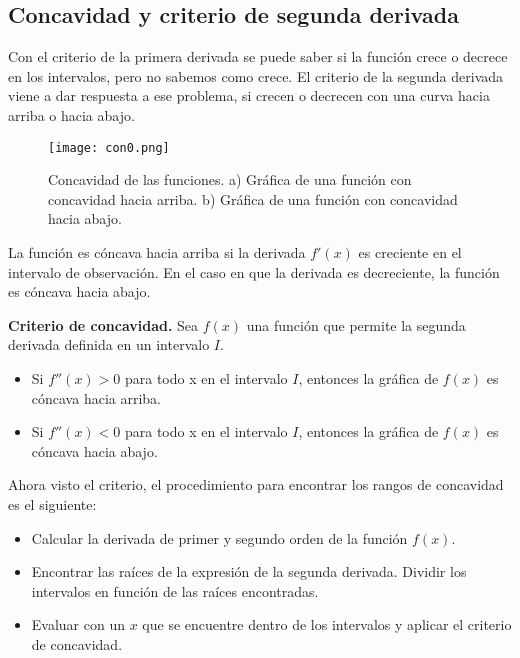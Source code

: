 \subsection{Concavidad y criterio de segunda derivada}

Con el criterio de la primera derivada se puede saber si la función crece o decrece en los intervalos, pero no sabemos como crece. El criterio de la segunda derivada viene a dar respuesta a ese problema, si crecen o decrecen con una curva hacia arriba o hacia abajo.

 \begin{center}
\begin{figure}[h!]
\centering
\texttt{[image: con0.png]}
\caption[Concavidad de las funciones.]{Concavidad de las funciones. a) Gráfica de una función con concavidad hacia arriba. b) Gráfica de una función con concavidad hacia abajo.} \label{con0}
\end{figure}
\end{center}

La función es cóncava hacia arriba si la derivada $f'(x)$ es creciente en el intervalo de observación. En el caso en que la derivada es decreciente, la función es cóncava hacia abajo.\\ 

\begin{mydef}
\textbf{Criterio de concavidad. } Sea $f(x)$ una función que permite la segunda derivada definida en un intervalo $I$.
\begin{itemize}
	\item Si $f''(x)>0$ para todo x en el intervalo $I$, entonces la gráfica de $f(x)$ es cóncava hacia arriba.
	\item Si $f''(x)<0$ para todo x en el intervalo $I$, entonces la gráfica de $f(x)$ es cóncava hacia abajo.
\end{itemize}
\end{mydef}

Ahora visto el criterio, el procedimiento para encontrar los rangos de concavidad es el siguiente: 
\begin{itemize}
	\item Calcular la derivada de primer y segundo orden de la función $f(x)$.
	\item Encontrar las raíces de la expresión de la segunda derivada. Dividir los intervalos en función de las raíces encontradas.
	\item Evaluar con un $x$ que se encuentre dentro de los intervalos y aplicar el criterio de concavidad.
\end{itemize}

